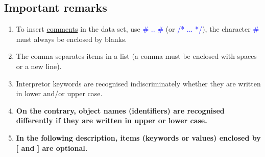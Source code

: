 






\subsection{Important remarks}
\begin{enumerate}
\item To insert \underline{comments} in the data set, use \textcolor{blue}{\# .. \#} (or \textcolor{blue}{/* ... */}), the character \textcolor{blue}{\#} must always be enclosed by blanks.
\item The comma separates items in a list (a comma must be enclosed with spaces or a new line).
\item Interpretor keywords are recognised indiscriminately whether they are written in lower and/or upper case.
\item \textbf{On the contrary, object names (identifiers) are recognised differently if they are written in upper or lower case.}
\item \textbf{In the following description, items (keywords or values) enclosed by [ and ] are optional.}
\end{enumerate}




